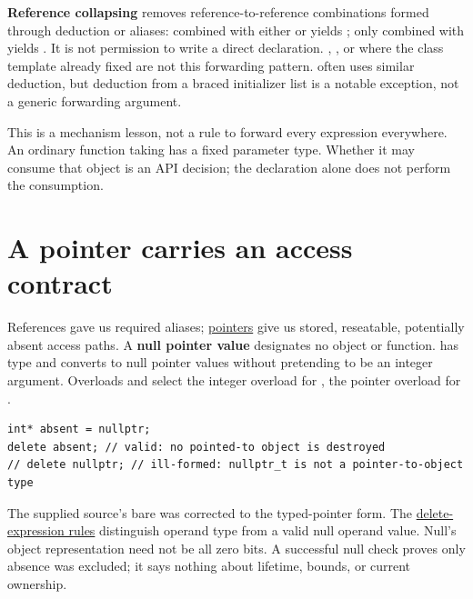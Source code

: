 \textbf{Reference collapsing} removes reference-to-reference combinations formed through deduction or aliases: \BookInlineCode{\&} combined with either \BookInlineCode{\&} or \BookInlineCode{\&\&} yields \BookInlineCode{\&}; only \BookInlineCode{\&\&} combined with \BookInlineCode{\&\&} yields \BookInlineCode{\&\&}. It is not permission to write a direct  declaration. , , or  where the class template already fixed  are not this forwarding pattern.  often uses similar deduction, but deduction from a braced initializer list is a notable exception, not a generic forwarding argument.

This is a mechanism lesson, not a rule to forward every expression everywhere. An ordinary function taking  has a fixed parameter type. Whether it may consume that object is an API decision; the declaration alone does not perform the consumption.

\section{A pointer carries an access contract}\label{01-foundations-i-ch003-a-pointer-carries-an-access-contract}

\hypertarget{01-foundations-i-ch003-a-pointer-carries-an-access-contract}{}

References gave us required aliases; \hyperref[appendix-afae48c31800]{pointers} give us stored, reseatable, potentially absent access paths. A \textbf{null pointer value} designates no object or function.  has type  and converts to null pointer values without pretending to be an integer argument. Overloads  and  select the integer overload for , the pointer overload for .

\begin{verbatim}
int* absent = nullptr;
delete absent; // valid: no pointed-to object is destroyed
// delete nullptr; // ill-formed: nullptr_t is not a pointer-to-object type
\end{verbatim}

The supplied source's bare  was corrected to the typed-pointer form. The \href{https://eel.is/c++draft/expr.delete}{delete-expression rules} distinguish operand type from a valid null operand value. Null's object representation need not be all zero bits. A successful null check proves only absence was excluded; it says nothing about lifetime, bounds, or current ownership.

